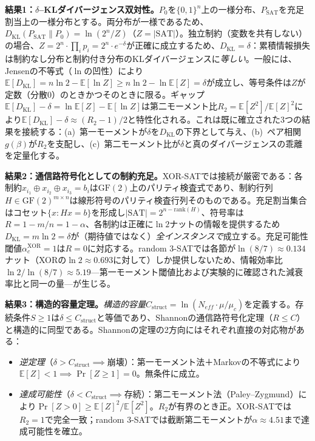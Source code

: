 \documentclass[11pt,a4paper]{article}
\begin{document}
\textbf{結果1：$\delta$--KLダイバージェンス双対性。}$P_0$を$\{0,1\}^n$上の一様分布、$P_{\text{SAT}}$を充足割当上の一様分布とする。両分布が一様であるため、$D_{\text{KL}}(P_{\text{SAT}} \| P_0) = \ln(2^n / Z)$（$Z = |\text{SAT}|$）。独立制約（変数を共有しない）の場合、$Z = 2^n \cdot \prod_i p_i = 2^n \cdot e^{-\delta}$が正確に成立するため、$D_{\text{KL}} = \delta$：累積情報損失は制約なし分布と制約付き分布のKLダイバージェンスに\emph{等しい}。一般には、Jensenの不等式（$\ln$の凹性）により$\mathbb{E}[D_{\text{KL}}] = n \ln 2 - \mathbb{E}[\ln Z] \geq n \ln 2 - \ln \mathbb{E}[Z] = \delta$が成立し、等号条件は$Z$が定数（分散0）のときかつそのときに限る。ギャップ$\mathbb{E}[D_{\text{KL}}] - \delta = \ln \mathbb{E}[Z] - \mathbb{E}[\ln Z]$は第二モーメント比$R_2 = \mathbb{E}[Z^2]/\mathbb{E}[Z]^2$により$\mathbb{E}[D_{\text{KL}}] - \delta \approx (R_2 - 1)/2$と特性化される。これは既に確立された3つの結果を接続する：(a)~第一モーメントが$\delta$を$D_{\text{KL}}$の下界として与え、(b)~ペア相関$g(\beta)$が$R_2$を支配し、(c)~第二モーメント比が$\delta$と真のダイバージェンスの乖離を定量化する。

\textbf{結果2：通信路符号化としての制約充足。}XOR-SATでは接続が厳密である：各制約$x_{i_1} \oplus x_{i_2} \oplus x_{i_3} = b_i$は$\text{GF}(2)$上のパリティ検査式であり、制約行列$H \in \text{GF}(2)^{m \times n}$は線形符号のパリティ検査行列そのものである。充足割当集合はコセット$\{x : Hx = b\}$を形成し$|\text{SAT}| = 2^{n - \text{rank}(H)}$、符号率は$R = 1 - m/n = 1 - \alpha$、各制約は正確に$\ln 2$ナットの情報を提供するため$D_{\text{KL}} = m \ln 2 = \delta$が（期待値ではなく）\emph{全インスタンスで}成立する。充足可能性閾値$\alpha_c^{\text{XOR}} = 1$は$R = 0$に対応する。random 3-SATでは各節が$\ln(8/7) \approx 0.134$ナット（XORの$\ln 2 \approx 0.693$に対して）しか提供しないため、情報効率比$\ln 2 / \ln(8/7) \approx 5.19$---第一モーメント閾値比および実験的に確認された減衰率比と同一の量---が生じる。

\textbf{結果3：構造的容量定理。}\emph{構造的容量}$C_{\text{struct}} = \ln(N_{eff} \cdot \mu/\mu_c)$を定義する。存続条件$S \geq 1$は$\delta \leq C_{\text{struct}}$と等価であり、Shannonの通信路符号化定理（$R \leq C$）と構造的に同型である。Shannonの定理の2方向にはそれぞれ直接の対応物がある：

\begin{itemize}
    \item \emph{逆定理}（$\delta > C_{\text{struct}} \implies$崩壊）：第一モーメント法＋Markovの不等式により$\mathbb{E}[Z] < 1 \implies \Pr[Z \geq 1] = 0$。無条件に成立。

    \item \emph{達成可能性}（$\delta < C_{\text{struct}} \implies$存続）：第二モーメント法（Paley--Zygmund）により$\Pr[Z > 0] \geq \mathbb{E}[Z]^2/\mathbb{E}[Z^2]$。$R_2$が有界のとき正。XOR-SATでは$R_2 = 1$で完全一致；random 3-SATでは截断第二モーメントが$\alpha \approx 4.51$まで達成可能性を確立。
\end{itemize}
\end{document}
